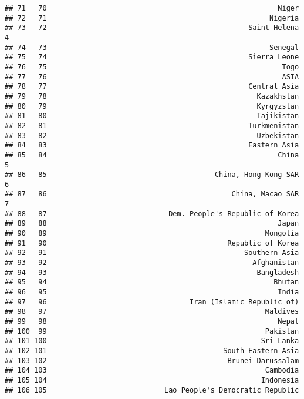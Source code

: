 \documentclass[]{article}
\begin{document}
\begin{verbatim}
## 71   70                                                       Niger   
## 72   71                                                     Nigeria   
## 73   72                                                Saint Helena  4
## 74   73                                                     Senegal   
## 75   74                                                Sierra Leone   
## 76   75                                                        Togo   
## 77   76                                                        ASIA   
## 78   77                                                Central Asia   
## 79   78                                                  Kazakhstan   
## 80   79                                                  Kyrgyzstan   
## 81   80                                                  Tajikistan   
## 82   81                                                Turkmenistan   
## 83   82                                                  Uzbekistan   
## 84   83                                                Eastern Asia   
## 85   84                                                       China  5
## 86   85                                        China, Hong Kong SAR  6
## 87   86                                            China, Macao SAR  7
## 88   87                             Dem. People's Republic of Korea   
## 89   88                                                       Japan   
## 90   89                                                    Mongolia   
## 91   90                                           Republic of Korea   
## 92   91                                               Southern Asia   
## 93   92                                                 Afghanistan   
## 94   93                                                  Bangladesh   
## 95   94                                                      Bhutan   
## 96   95                                                       India   
## 97   96                                  Iran (Islamic Republic of)   
## 98   97                                                    Maldives   
## 99   98                                                       Nepal   
## 100  99                                                    Pakistan   
## 101 100                                                   Sri Lanka   
## 102 101                                          South-Eastern Asia   
## 103 102                                           Brunei Darussalam   
## 104 103                                                    Cambodia   
## 105 104                                                   Indonesia   
## 106 105                            Lao People's Democratic Republic   

\end{verbatim}
\end{document}

